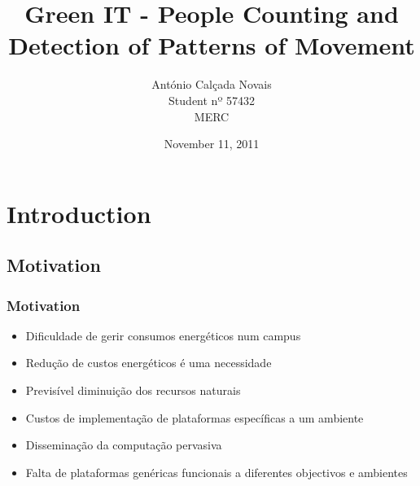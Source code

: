 \documentclass[]{beamer}
\title[People Counting and Detection of Patterns of Movement] %
{Green IT - People Counting and Detection of Patterns of Movement}
\subtitle
{}
\author[António Calçada Novais] %
{António Calçada Novais \\ Student nº 57432 \\ MERC}
\institute[] %
{
  INESC-ID, Communications Networks and Mobility\\
  Instituto Superior Técnico - Campus TagusPark
}
\date %
{November 11, 2011}
\begin{document}
\begin{frame}
  \titlepage
\end{frame}

\section[Outline]{}

\begin{frame}
  \tableofcontents
\end{frame}

\section{Introduction}

\subsection{Motivation}

\begin{frame}
  \frametitle{Motivation}   %

  \begin{itemize}
	\item Dificuldade de gerir consumos energéticos num campus
	\item Redução de custos energéticos é uma necessidade
	\item Previsível diminuição dos recursos naturais

	\item Custos de implementação de plataformas específicas a um ambiente
	\item Disseminação da computação pervasiva 
	\item Falta de plataformas genéricas funcionais a diferentes objectivos e ambientes

  \end{itemize}
\end{frame}
\end{document}
